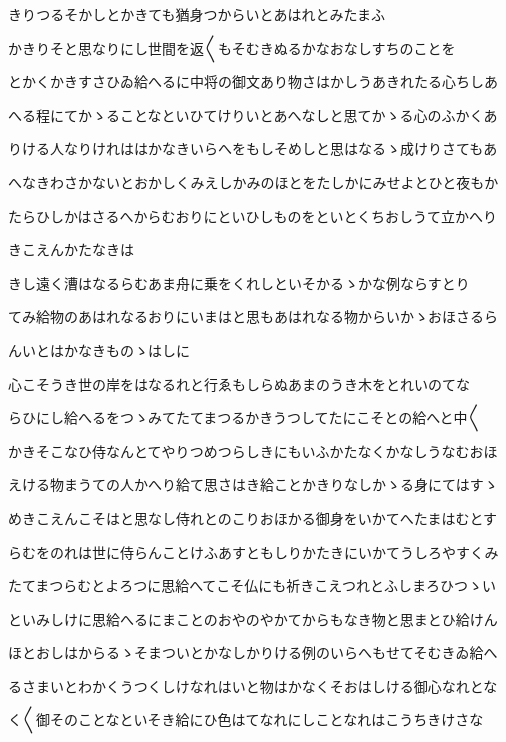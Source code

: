 \documentclass[a4paper,11pt,landscape]{ltjtarticle}
\begin{document}
\par\medskip
きりつるそかしとかきても猶身つからいとあはれとみたまふ
\par\medskip
かきりそと思なりにし世間を返〱もそむきぬるかなおなしすちのことを
\par\medskip
とかくかきすさひゐ給へるに中将の御文あり物さはかしうあきれたる心ちしあ
\par\medskip
へる程にてかゝることなといひてけりいとあへなしと思てかゝる心のふかくあ
\par\medskip
りける人なりけれははかなきいらへをもしそめしと思はなるゝ成けりさてもあ
\par\medskip
へなきわさかないとおかしくみえしかみのほとをたしかにみせよとひと夜もか
\par\medskip
たらひしかはさるへからむおりにといひしものをといとくちおしうて立かへり
\par\medskip
きこえんかたなきは
\par\medskip
きし遠く漕はなるらむあま舟に乗をくれしといそかるゝかな例ならすとり
\par\medskip
てみ給物のあはれなるおりにいまはと思もあはれなる物からいかゝおほさるら
\par\medskip
んいとはかなきものゝはしに
\par\medskip
心こそうき世の岸をはなるれと行ゑもしらぬあまのうき木をとれいのてな
\par\medskip
らひにし給へるをつゝみてたてまつるかきうつしてたにこそとの給へと中〱
\par\medskip
かきそこなひ侍なんとてやりつめつらしきにもいふかたなくかなしうなむおほ
\par\medskip
えける物まうての人かへり給て思さはき給ことかきりなしかゝる身にてはすゝ
\par\medskip
めきこえんこそはと思なし侍れとのこりおほかる御身をいかてへたまはむとす
\par\medskip
らむをのれは世に侍らんことけふあすともしりかたきにいかてうしろやすくみ
\par\medskip
たてまつらむとよろつに思給へてこそ仏にも祈きこえつれとふしまろひつゝい
\par\medskip
といみしけに思給へるにまことのおやのやかてからもなき物と思まとひ給けん
\par\medskip
ほとおしはからるゝそまついとかなしかりける例のいらへもせてそむきゐ給へ
\par\medskip
るさまいとわかくうつくしけなれはいと物はかなくそおはしける御心なれとな
\par\medskip
く〱御そのことなといそき給にひ色はてなれにしことなれはこうちきけさな
\par\medskip
\end{document}
